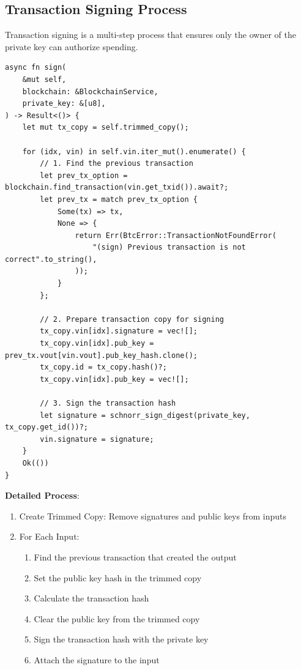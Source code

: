 \subsection{Transaction Signing Process}
\label{sec:ch08-tx-signing}

Transaction signing is a multi-step process that ensures only the owner of the private key can authorize spending.

\begin{listing}[htbp]
\caption{Multi-input transaction signing ()}
\label{lst:ch08-tx-sign}
\begin{verbatim}
async fn sign(
    &mut self,
    blockchain: &BlockchainService,
    private_key: &[u8],
) -> Result<()> {
    let mut tx_copy = self.trimmed_copy();

    for (idx, vin) in self.vin.iter_mut().enumerate() {
        // 1. Find the previous transaction
        let prev_tx_option = blockchain.find_transaction(vin.get_txid()).await?;
        let prev_tx = match prev_tx_option {
            Some(tx) => tx,
            None => {
                return Err(BtcError::TransactionNotFoundError(
                    "(sign) Previous transaction is not correct".to_string(),
                ));
            }
        };

        // 2. Prepare transaction copy for signing
        tx_copy.vin[idx].signature = vec![];
        tx_copy.vin[idx].pub_key = prev_tx.vout[vin.vout].pub_key_hash.clone();
        tx_copy.id = tx_copy.hash()?;
        tx_copy.vin[idx].pub_key = vec![];

        // 3. Sign the transaction hash
        let signature = schnorr_sign_digest(private_key, tx_copy.get_id())?;
        vin.signature = signature;
    }
    Ok(())
}
\end{verbatim}
\end{listing}

\textbf{Detailed Process}:
\begin{enumerate}
  \item Create Trimmed Copy: Remove signatures and public keys from inputs
  \item For Each Input:
  \begin{enumerate}
    \item Find the previous transaction that created the output
    \item Set the public key hash in the trimmed copy
    \item Calculate the transaction hash
    \item Clear the public key from the trimmed copy
    \item Sign the transaction hash with the private key
    \item Attach the signature to the input
  \end{enumerate}
\end{enumerate}


